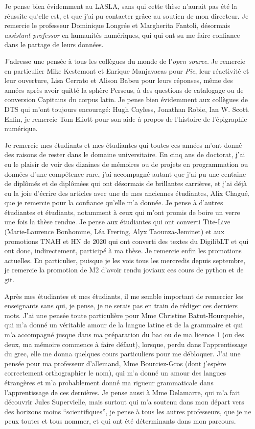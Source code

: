 Je pense bien évidemment au LASLA, sans qui cette thèse n'aurait pas été la réussite qu'elle est, et que j'ai pu contacter grâce au soutien de mon directeur. Je remercie le professeur Dominique Longrée et 
Margherita Fantoli, désormais \textit{assistant professor} en humanités numériques, qui qui ont su me faire confiance dans le partage de leurs données.

J'adresse une pensée à tous les collègues du monde de l'\textit{open source}. Je remercie en particulier Mike Kestemont et Enrique Manjavacas pour \textit{Pie}, leur réactivité et leur ouverture, Lisa Cerrato et Alison Babeu pour leurs réponses, même des années après avoir quitté la sphère Perseus, à des questions de catalogage ou de conversion Capitains du corpus latin. Je pense bien évidemment aux collègues de DTS qui m'ont toujours encouragé: Hugh Cayless, Jonathan Robie, Ian W. Scott. Enfin, je remercie Tom Eliott pour son aide à propos de l'histoire de l'épigraphie numérique. 

Je remercie mes étudiants et mes étudiantes qui toutes ces années m'ont donné des raisons de rester dans le domaine universitaire. En cinq ans de doctorat, j'ai eu le plaisir de voir des dizaines de mémoires ou de projets en programmation ou données d'une compétence rare, j'ai accompagné autant que j'ai pu une centaine de diplômés et de diplômées qui ont désormais de brillantes carrières, et j'ai déjà eu la joie d'écrire des articles avec une de mes anciennes étudiantes, Alix Chagué, que je remercie pour la confiance qu'elle m'a donnée. Je pense à d'autres étudiantes et étudiants, notamment à ceux qui m'ont promis de boire un verre une fois la thèse rendue. Je pense aux étudiantes qui ont converti Tite-Live (Marie-Laurence Bonhomme, Léa Frering, Alyx Taounza-Jeminet) et aux promotions TNAH et HN de 2020 qui ont converti des textes du DigilibLT et qui ont donc, indirectement, participé à ma thèse. Je remercie enfin les promotions actuelles. En particulier, puisque je les vois tous les mercredis depuis septembre, je remercie la promotion de M2 d'avoir rendu joviaux ces cours de python et de git.

Après mes étudiantes et mes étudiants, il me semble important de remercier les enseignants sans qui, je pense, je ne serais pas en train de rédiger ces derniers mots. J'ai une pensée toute particulière pour Mme Christine Batut-Hourquebie, qui m'a donné un véritable amour de la langue latine et de la grammaire et qui m'a accompagné jusque dans ma préparation du bac ou de ma licence 1 (ou des deux, ma mémoire commence à faire défaut), lorsque, perdu dans l'apprentissage du grec, elle me donna quelques cours particuliers pour me débloquer. J'ai une pensée pour ma professeur d'allemand, Mme Bourciez-Gros (dont j'espère correctement orthographier le nom), qui m'a donné un amour des langues étrangères et m'a probablement donné ma rigueur grammaticale dans l'apprentissage de ces dernières. Je pense aussi à Mme Delamarre, qui m'a fait découvrir Jules Supervielle, mais surtout qui m'a soutenu dans mon départ vers des horizons moins \enquote{scientifiques}, je pense à tous les autres professeurs, que je ne peux toutes et tous nommer, et qui ont été déterminants dans mon parcours.

